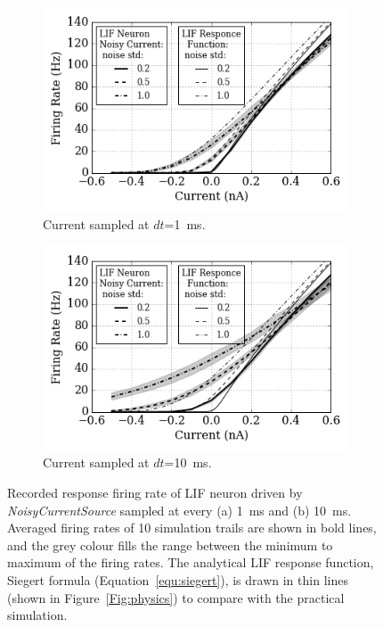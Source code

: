 	
	\begin{figure}[tbp!]
		\centering
		\begin{subfigure}[t]{0.49\textwidth}
			\includegraphics[width=\textwidth]{pics_iconip/2-1.png}
			\caption{Current sampled at $dt$=1~ms.}
		\end{subfigure}
		\begin{subfigure}[t]{0.49\textwidth}
			\includegraphics[width=\textwidth]{pics_iconip/2-10.png}
			\caption{Current sampled at $dt$=10~ms.}
		\end{subfigure}
		\caption{Recorded response firing rate of \DIFdelbeginFL {}\DIFdelendFL \DIFaddbeginFL {}\DIFaddendFL LIF neuron driven by \textit{NoisyCurrentSource} sampled at every (a) 1~ms and (b) 10~ms. Averaged firing rates of 10 simulation trails are shown in bold lines, and the grey colour fills the range between the minimum to maximum of the firing rates. The analytical LIF response function, \DIFaddbeginFL {}\DIFaddendFL Siegert formula (Equation~\ref{equ:siegert}), is drawn in thin lines (shown in Figure~\ref{Fig:physics}) to compare with the practical simulation.}
		\label{Fig:current}
	\end{figure}

